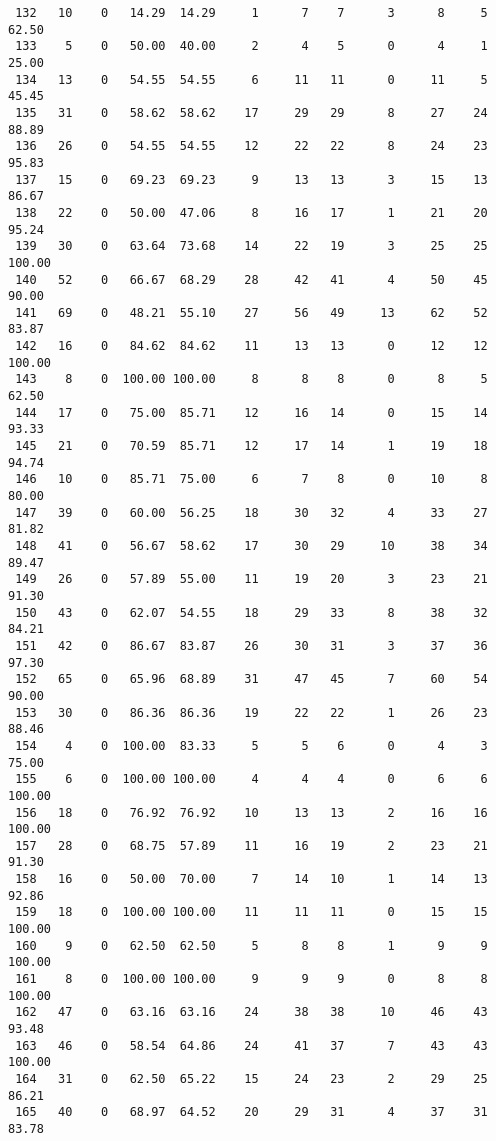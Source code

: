 \begin{verbatim}
 132   10    0   14.29  14.29     1      7    7      3      8     5    62.50
 133    5    0   50.00  40.00     2      4    5      0      4     1    25.00
 134   13    0   54.55  54.55     6     11   11      0     11     5    45.45
 135   31    0   58.62  58.62    17     29   29      8     27    24    88.89
 136   26    0   54.55  54.55    12     22   22      8     24    23    95.83
 137   15    0   69.23  69.23     9     13   13      3     15    13    86.67
 138   22    0   50.00  47.06     8     16   17      1     21    20    95.24
 139   30    0   63.64  73.68    14     22   19      3     25    25   100.00
 140   52    0   66.67  68.29    28     42   41      4     50    45    90.00
 141   69    0   48.21  55.10    27     56   49     13     62    52    83.87
 142   16    0   84.62  84.62    11     13   13      0     12    12   100.00
 143    8    0  100.00 100.00     8      8    8      0      8     5    62.50
 144   17    0   75.00  85.71    12     16   14      0     15    14    93.33
 145   21    0   70.59  85.71    12     17   14      1     19    18    94.74
 146   10    0   85.71  75.00     6      7    8      0     10     8    80.00
 147   39    0   60.00  56.25    18     30   32      4     33    27    81.82
 148   41    0   56.67  58.62    17     30   29     10     38    34    89.47
 149   26    0   57.89  55.00    11     19   20      3     23    21    91.30
 150   43    0   62.07  54.55    18     29   33      8     38    32    84.21
 151   42    0   86.67  83.87    26     30   31      3     37    36    97.30
 152   65    0   65.96  68.89    31     47   45      7     60    54    90.00
 153   30    0   86.36  86.36    19     22   22      1     26    23    88.46
 154    4    0  100.00  83.33     5      5    6      0      4     3    75.00
 155    6    0  100.00 100.00     4      4    4      0      6     6   100.00
 156   18    0   76.92  76.92    10     13   13      2     16    16   100.00
 157   28    0   68.75  57.89    11     16   19      2     23    21    91.30
 158   16    0   50.00  70.00     7     14   10      1     14    13    92.86
 159   18    0  100.00 100.00    11     11   11      0     15    15   100.00
 160    9    0   62.50  62.50     5      8    8      1      9     9   100.00
 161    8    0  100.00 100.00     9      9    9      0      8     8   100.00
 162   47    0   63.16  63.16    24     38   38     10     46    43    93.48
 163   46    0   58.54  64.86    24     41   37      7     43    43   100.00
 164   31    0   62.50  65.22    15     24   23      2     29    25    86.21
 165   40    0   68.97  64.52    20     29   31      4     37    31    83.78

\end{verbatim}
